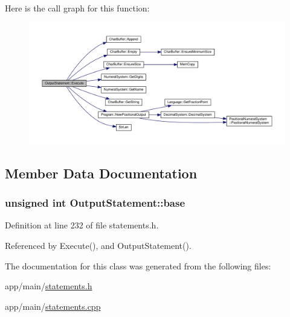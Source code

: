 Here is the call graph for this function\+:\nopagebreak
\begin{figure}[H]
\begin{center}
\leavevmode
\includegraphics[width=350pt]{classOutputStatement_a870c0d2b4bffb94e542d1e5890ec3c20_cgraph}
\end{center}
\end{figure}




\subsection{Member Data Documentation}
\subsubsection[{\texorpdfstring{base}{base}}]{\setlength{\rightskip}{0pt plus 5cm}unsigned int Output\+Statement\+::base\hspace{0.3cm}{\ttfamily [private]}}\hypertarget{classOutputStatement_ab0731e7d23a5d915e8b2ee12ceb1dbc5}{}\label{classOutputStatement_ab0731e7d23a5d915e8b2ee12ceb1dbc5}


Definition at line 232 of file statements.\+h.



Referenced by Execute(), and Output\+Statement().



The documentation for this class was generated from the following files\+:\begin{DoxyCompactItemize}
\item 
app/main/\hyperlink{statements_8h}{statements.\+h}\item 
app/main/\hyperlink{statements_8cpp}{statements.\+cpp}\end{DoxyCompactItemize}
